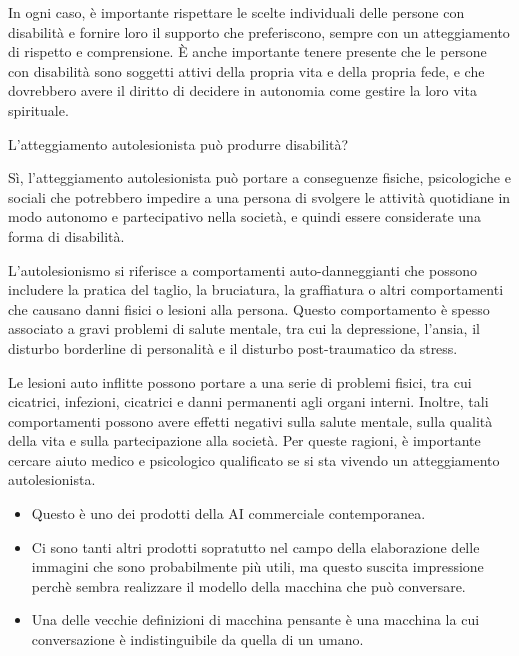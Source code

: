 \documentclass[xcolor=svgnames]{beamer}
\begin{document}
\begin{frame}
\begin{description}
In ogni caso, è importante rispettare le scelte individuali delle persone con disabilità e fornire loro il supporto che preferiscono, sempre con un atteggiamento di rispetto e comprensione. È anche importante tenere presente che le persone con disabilità sono soggetti attivi della propria vita e della propria fede, e che dovrebbero avere il diritto di decidere in autonomia come gestire la loro vita spirituale.

\newpage

\item[Giovanni]
L'atteggiamento autolesionista può produrre disabilità? 

\item[chat-GPT] Sì, l'atteggiamento autolesionista può portare a conseguenze fisiche, psicologiche e sociali che potrebbero impedire a una persona di svolgere le attività quotidiane in modo autonomo e partecipativo nella società, e quindi essere considerate una forma di disabilità.

L'autolesionismo si riferisce a comportamenti auto-danneggianti che possono includere la pratica del taglio, la bruciatura, la graffiatura o altri comportamenti che causano danni fisici o lesioni alla persona. Questo comportamento è spesso associato a gravi problemi di salute mentale, tra cui la depressione, l'ansia, il disturbo borderline di personalità e il disturbo post-traumatico da stress.

\tiny Le lesioni auto inflitte possono portare a una serie di problemi fisici, tra cui cicatrici, infezioni, cicatrici e danni permanenti agli organi interni. Inoltre, tali comportamenti possono avere effetti negativi sulla salute mentale, sulla qualità della vita e sulla partecipazione alla società. Per queste ragioni, è importante cercare aiuto medico e psicologico qualificato se si sta vivendo un atteggiamento autolesionista.
\end{description}

\newpage 

\begin{itemize}
    \item Questo è uno dei prodotti della 
    AI commerciale contemporanea.

    \item Ci sono tanti altri prodotti sopratutto nel campo della elaborazione delle immagini che sono probabilmente più utili, ma questo suscita impressione perchè sembra realizzare il modello della macchina che può conversare.

    \item Una delle vecchie definizioni di macchina pensante è una macchina la cui conversazione è indistinguibile da quella di un umano.


\end{itemize}
\end{frame}
\end{document}
